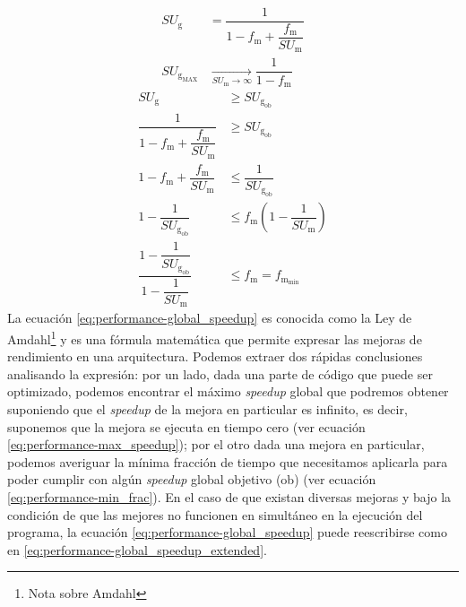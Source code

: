 \begin{equation}
  \label{eq:performance-max_speedup}
  \begin{split}
    SU_{\text{g}} & = \dfrac{ 1 } { 1 - f_{\text{m}} + 
\dfrac{ f_{\text{m}} } { SU_{\text{m}} } }\\
    SU_{\text{g}_{\text{MAX}}} & \underset { SU_{\text{m}} 
\rightarrow \infty } { \longrightarrow } \dfrac{ 1 } { 1 - f_{\text{m}} }
  \end{split}
\end{equation}
\begin{equation}
  \label{eq:performance-min_frac}
  \begin{split}
    SU_{\text{g}} & \geqslant SU_{\text{g}_{\text{ob}}}\\
    \dfrac{ 1 } { 1 - f_{\text{m}} + \dfrac{ f_{\text{m}} } { SU_{\text{m}} } } 
& \geqslant SU_{\text{g}_{\text{ob}}}\\
    1 - f_{\text{m}} + \dfrac{ f_{\text{m}} } { SU_{\text{m}} } & \leqslant 
\dfrac{ 1 } { SU_{\text{g}_{\text{ob}}} }\\
    1 - \dfrac{ 1 } { SU_{\text{g}_{\text{ob}}} } & \leqslant f_{\text{m}} 
\left( 1 - \dfrac{ 1 } { SU_{\text{m}} } \right)\\
    \dfrac{ 1 - \dfrac{ 1 } { SU_{\text{g}_{\text{ob}}} } } { 1 - \dfrac{ 1 } { 
SU_{\text{m}} } } & \leqslant f_{\text{m}} = f_{\text{m}_{\text{min}}}
  \end{split}
\end{equation}
La ecuación \ref{eq:performance-global_speedup} es conocida como la Ley de 
Amdahl\footnote{Nota sobre Amdahl} y es una fórmula matemática que permite 
expresar las mejoras de rendimiento en una arquitectura. Podemos extraer dos 
rápidas conclusiones analisando la expresión: por un lado, dada una parte de 
código que puede ser optimizado, podemos encontrar el máximo \emph{speedup} 
global que podremos obtener suponiendo que el \emph{speedup} de la mejora en 
particular es infinito, es decir, suponemos que la mejora se ejecuta en tiempo 
cero (ver ecuación \ref{eq:performance-max_speedup}); por el otro dada una 
mejora en particular, podemos averiguar la mínima fracción de tiempo que 
necesitamos aplicarla para poder cumplir con algún \emph{speedup} global 
objetivo (ob) (ver ecuación \ref{eq:performance-min_frac}). En el caso de que 
existan diversas mejoras y bajo la condición de que las mejores no funcionen en 
simultáneo en la ejecución del programa, la ecuación 
\ref{eq:performance-global_speedup} puede reescribirse como en 
\ref{eq:performance-global_speedup_extended}.
